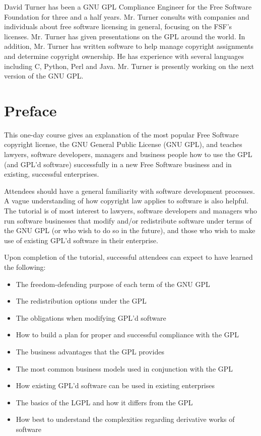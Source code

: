 \documentclass[11pt, letterpaper]{book}
\begin{document}
David Turner has been a GNU GPL Compliance Engineer for the Free
Software Foundation for three and a half years.  Mr. Turner consults
with companies and individuals about free software licensing in
general, focusing on the FSF's licenses.  Mr. Turner has given
presentations on the GPL around the world.  In addition, Mr. Turner
has written software to help manage copyright assignments and
determine copyright ownership. He has experience with several
languages including C, Python, Perl and Java.  Mr. Turner is presently
working on the next version of the GNU GPL.

\chapter*{Preface}

This one-day course gives an explanation of the most popular Free
Software copyright license, the GNU General Public License (GNU GPL),
and teaches lawyers, software developers, managers and business people
how to use the GPL (and GPL'd software) successfully in a new Free
Software business and in existing, successful enterprises.

Attendees should have a general familiarity with software development
processes. A vague understanding of how copyright law applies to software
is also helpful. The tutorial is of most interest to lawyers, software
developers and managers who run software businesses that modify and/or
redistribute software under terms of the GNU GPL (or who wish to do so in
the future), and those who wish to make use of existing GPL'd software in
their enterprise.

Upon completion of the tutorial, successful attendees can expect to have
learned the following:

\begin{itemize}

  \item The freedom-defending purpose of each term of the GNU GPL

  \item The redistribution options under the GPL

  \item The obligations when modifying GPL'd software

  \item How to build a plan for proper and successful compliance with the GPL

  \item The business advantages that the GPL provides

  \item The most common business models used in conjunction with the GPL

  \item How existing GPL'd software can be used in existing enterprises

  \item The basics of the LGPL and how it differs from the GPL

  \item How best to understand the complexities regarding derivative
        works of software
\end{itemize}
\end{document}
